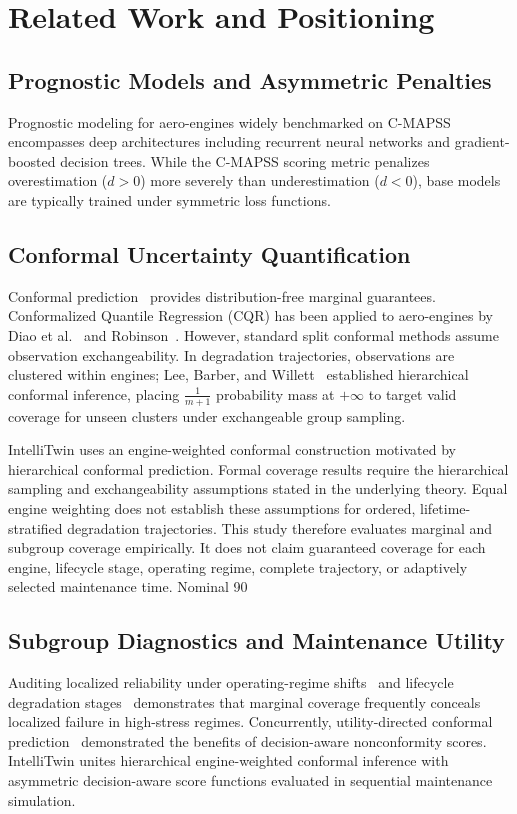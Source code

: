 \section{Related Work and Positioning}

\subsection{Prognostic Models and Asymmetric Penalties}
Prognostic modeling for aero-engines widely benchmarked on C-MAPSS~\cite{saxena2008damage} encompasses deep architectures including recurrent neural networks and gradient-boosted decision trees. While the C-MAPSS scoring metric penalizes overestimation ($d > 0$) more severely than underestimation ($d < 0$), base models are typically trained under symmetric loss functions.

\subsection{Conformal Uncertainty Quantification}
Conformal prediction~\cite{javanmardi2023conformal} provides distribution-free marginal guarantees. Conformalized Quantile Regression (CQR) has been applied to aero-engines by Diao et al.~\cite{diao2026turbofan} and Robinson~\cite{robinson2026riskaware}. However, standard split conformal methods assume observation exchangeability. In degradation trajectories, observations are clustered within engines; Lee, Barber, and Willett~\cite{lee2023hierarchical} established hierarchical conformal inference, placing $\frac{1}{m+1}$ probability mass at $+\infty$ to target valid coverage for unseen clusters under exchangeable group sampling.

IntelliTwin uses an engine-weighted conformal construction motivated by hierarchical conformal prediction. Formal coverage results require the hierarchical sampling and exchangeability assumptions stated in the underlying theory. Equal engine weighting does not establish these assumptions for ordered, lifetime-stratified degradation trajectories. This study therefore evaluates marginal and subgroup coverage empirically. It does not claim guaranteed coverage for each engine, lifecycle stage, operating regime, complete trajectory, or adaptively selected maintenance time. Nominal 90%

\subsection{Subgroup Diagnostics and Maintenance Utility}
Auditing localized reliability under operating-regime shifts~\cite{yang2026empirical} and lifecycle degradation stages~\cite{benabdennour2026grouped} demonstrates that marginal coverage frequently conceals localized failure in high-stress regimes. Concurrently, utility-directed conformal prediction~\cite{cortesgomez2025utility} demonstrated the benefits of decision-aware nonconformity scores. IntelliTwin unites hierarchical engine-weighted conformal inference with asymmetric decision-aware score functions evaluated in sequential maintenance simulation.
